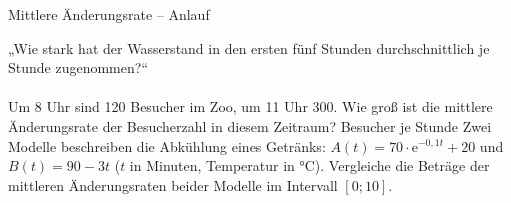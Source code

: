 \setcounter{aufgabe}{0}

\begin{aufgabe}{Mittlere Änderungsrate – Anlauf}
\begin{teile}
\teil „Wie stark hat der Wasserstand in den ersten fünf Stunden durchschnittlich je Stunde zugenommen?“ \\  \\ 
\teil Um 8 Uhr sind 120 Besucher im Zoo, um 11 Uhr 300. Wie groß ist die mittlere Änderungsrate der Besucherzahl in diesem Zeitraum? \leerfeld Besucher je Stunde
\teil Zwei Modelle beschreiben die Abkühlung eines Getränks: $A(t) = 70 \cdot \mathrm{e}^{-0{,}1t} + 20$ und $B(t) = 90 - 3t$ ($t$ in Minuten, Temperatur in °C). Vergleiche die Beträge der mittleren Änderungsraten beider Modelle im Intervall $[0; 10]$.
\end{teile}
\end{aufgabe}

